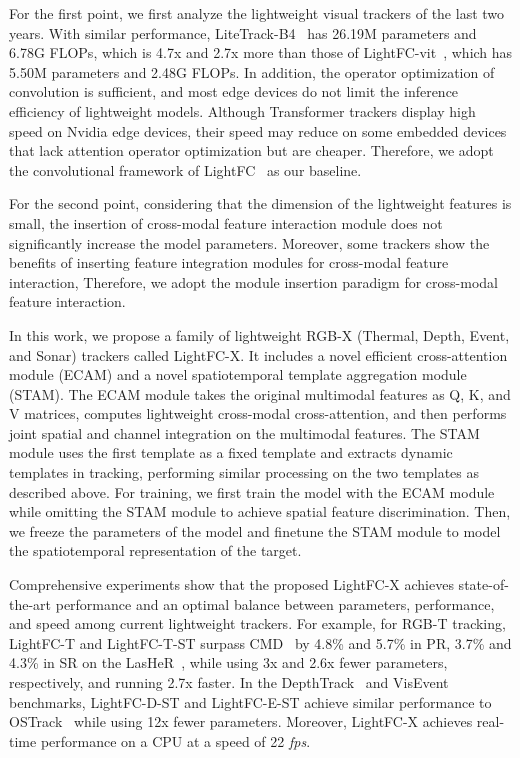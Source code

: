For the first point, we first analyze the lightweight visual trackers of the last two years. With similar performance, LiteTrack-B4~\cite{litetrack} has 26.19M parameters and 6.78G FLOPs, which is 4.7x and 2.7x more than those of LightFC-vit~\cite{lightfc}, which has 5.50M parameters and 2.48G FLOPs. In addition, the operator optimization of convolution is sufficient, and most edge devices do not limit the inference efficiency of lightweight models. Although Transformer trackers display high speed on Nvidia edge devices, their speed may reduce on some embedded devices that lack attention operator optimization but are cheaper. Therefore, we adopt the convolutional framework of LightFC~\cite{lightfc} as our baseline.

For the second point, considering that the dimension of the lightweight features is small, the insertion of cross-modal feature interaction module does not significantly increase the model parameters. Moreover, some trackers \cite{tbsi,cstnet} show the benefits of inserting feature integration modules for cross-modal feature interaction, Therefore, we adopt the module insertion paradigm for cross-modal feature interaction.

In this work, we propose a family of lightweight RGB-X (Thermal, Depth, Event, and Sonar) trackers called LightFC-X. It includes a novel efficient cross-attention module (ECAM) and a novel spatiotemporal template aggregation module (STAM). The ECAM module takes the original multimodal features as Q, K, and V matrices, computes lightweight cross-modal cross-attention, and then performs joint spatial and channel integration on the multimodal features. The STAM module uses the first template as a fixed template and extracts dynamic templates in tracking, performing similar processing on the two templates as described above. For training, we first train the model with the ECAM module while omitting the STAM module to achieve spatial feature discrimination. Then, we freeze the parameters of the model and finetune the STAM module to model the spatiotemporal representation of the target.


Comprehensive experiments show that the proposed LightFC-X achieves state-of-the-art performance and an optimal balance between parameters, performance, and speed among current lightweight trackers. For example, for RGB-T tracking, LightFC-T and LightFC-T-ST surpass CMD~\cite{cmd} by 4.8\% and 5.7\% in PR, 3.7\% and 4.3\% in SR on the LasHeR~\cite{lasher}, while using 3x and 2.6x fewer parameters, respectively, and running 2.7x faster. In the DepthTrack~\cite{depthtrack} and VisEvent~\cite{visevent} benchmarks, LightFC-D-ST and LightFC-E-ST achieve similar performance to OSTrack~\cite{ostrack} while using 12x fewer parameters. Moreover, LightFC-X achieves real-time performance on a CPU at a speed of 22 \textit{fps}.

